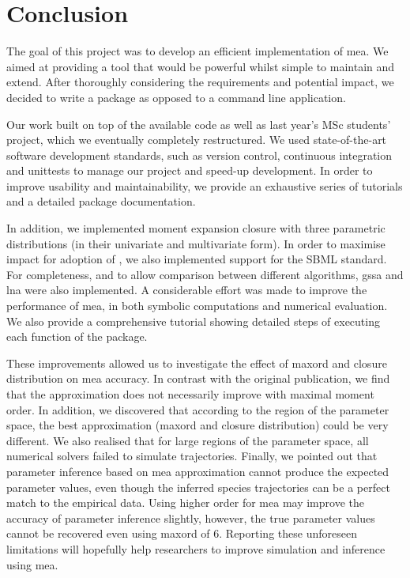 \section{Conclusion} \label{sec:conclus}

The goal of this project was to develop an efficient \py{} implementation of \acrlong{mea}.
We aimed at providing a tool that would be powerful whilst simple to maintain and extend.
After thoroughly considering the requirements and potential impact, we decided to write a \py{} package as opposed to a command line application.

Our work built on top of the available \mat{} code as well as last year's MSc students' project, which we eventually completely restructured.
We used state-of-the-art software development standards, such as version control, continuous integration and unittests to manage our project and speed-up development.
In order to improve usability and maintainability, we provide an exhaustive series of tutorials and a detailed package documentation.

In addition, we implemented moment expansion closure with three parametric distributions (in their univariate and multivariate form).
In order to maximise impact for adoption of \means, we also implemented support for the SBML standard.
For completeness, and to allow comparison between different algorithms, \gls{gssa} and \gls{lna} were also implemented.
A considerable effort was made to improve the performance of \gls{mea},  in both symbolic computations and numerical evaluation.
We also provide a comprehensive tutorial showing detailed steps of executing each function of the package.

These improvements allowed us to investigate the effect of \gls{maxord} and closure distribution on \gls{mea} accuracy.
In contrast with the original publication, we find that the approximation does not necessarily improve with maximal moment order.
In addition, we discovered that according to the region of the parameter space, the best approximation (\gls{maxord} and closure distribution) could be very different.
We also realised that for large regions of the parameter space, all numerical solvers failed to simulate trajectories.
Finally, we pointed out that parameter inference based on \gls{mea} approximation cannot produce the expected parameter values, even though the inferred species trajectories can be a perfect match to the empirical data. Using higher order for \gls{mea} may improve the accuracy of parameter inference slightly, however, the true parameter values cannot be recovered even using \gls{maxord} of 6.
Reporting these unforeseen limitations will hopefully help researchers to improve simulation and inference using \gls{mea}.

